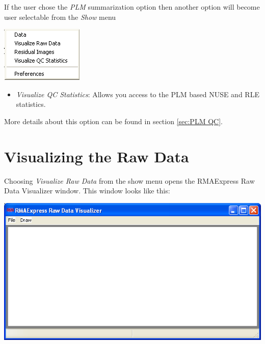 \documentclass[11pt]{report}
\begin{document}
If the user chose the {\it PLM} summarization option then another option will become user selectable from the {\it Show} menu
\begin{center}
\includegraphics[scale=0.5]{showmenu3}
\end{center}
\begin{itemize}
\item {\it Visualize QC Statistics}: Allows you access to the PLM based NUSE and RLE statistics. 
\end{itemize}
More details about this option can be found in section \ref{sec:PLM QC}.


\section{Visualizing the Raw Data} \label{sec:visualizerawdata}

Choosing {\it  Visualize Raw Data} from the show menu opens the RMAExpress Raw Data Visualizer window. This window looks like this: 
\begin{center}
\includegraphics[scale=0.5]{rawdatavisualize1.png}
\end{center}
\end{document}
